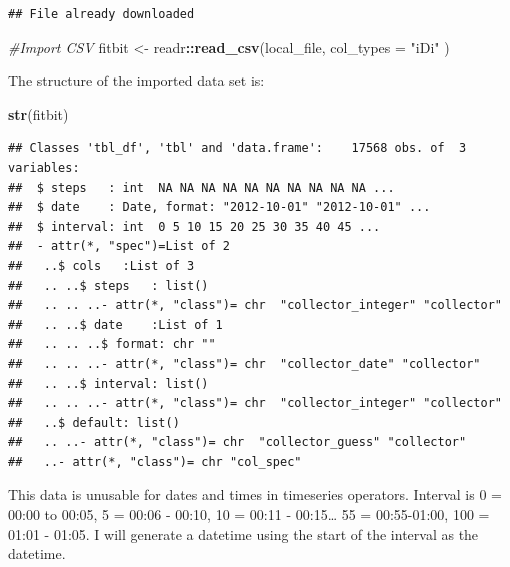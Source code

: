 \documentclass[]{article}
\newenvironment{Shaded}{\begin{snugshade}}{\end{snugshade}}
\newcommand{\KeywordTok}[1]{\textcolor[rgb]{0.13,0.29,0.53}{\textbf{#1}}}
\newcommand{\DataTypeTok}[1]{\textcolor[rgb]{0.13,0.29,0.53}{#1}}
\newcommand{\DecValTok}[1]{\textcolor[rgb]{0.00,0.00,0.81}{#1}}
\newcommand{\StringTok}[1]{\textcolor[rgb]{0.31,0.60,0.02}{#1}}
\newcommand{\CommentTok}[1]{\textcolor[rgb]{0.56,0.35,0.01}{\textit{#1}}}
\newcommand{\OperatorTok}[1]{\textcolor[rgb]{0.81,0.36,0.00}{\textbf{#1}}}
\newcommand{\NormalTok}[1]{#1}
\begin{document}
\begin{verbatim}
## File already downloaded
\end{verbatim}

\begin{Shaded}
\begin{Highlighting}[]
\CommentTok{#Import CSV}
\NormalTok{fitbit <-}\StringTok{ }\NormalTok{readr}\OperatorTok{::}\KeywordTok{read_csv}\NormalTok{(local_file, }\DataTypeTok{col_types =} \StringTok{"iDi"}\NormalTok{ )}
\end{Highlighting}
\end{Shaded}

The structure of the imported data set is:

\begin{Shaded}
\begin{Highlighting}[]
\KeywordTok{str}\NormalTok{(fitbit)}
\end{Highlighting}
\end{Shaded}

\begin{verbatim}
## Classes 'tbl_df', 'tbl' and 'data.frame':    17568 obs. of  3 variables:
##  $ steps   : int  NA NA NA NA NA NA NA NA NA NA ...
##  $ date    : Date, format: "2012-10-01" "2012-10-01" ...
##  $ interval: int  0 5 10 15 20 25 30 35 40 45 ...
##  - attr(*, "spec")=List of 2
##   ..$ cols   :List of 3
##   .. ..$ steps   : list()
##   .. .. ..- attr(*, "class")= chr  "collector_integer" "collector"
##   .. ..$ date    :List of 1
##   .. .. ..$ format: chr ""
##   .. .. ..- attr(*, "class")= chr  "collector_date" "collector"
##   .. ..$ interval: list()
##   .. .. ..- attr(*, "class")= chr  "collector_integer" "collector"
##   ..$ default: list()
##   .. ..- attr(*, "class")= chr  "collector_guess" "collector"
##   ..- attr(*, "class")= chr "col_spec"
\end{verbatim}

This data is unusable for dates and times in timeseries operators.
Interval is 0 = 00:00 to 00:05, 5 = 00:06 - 00:10, 10 = 00:11 -
00:15\ldots{} 55 = 00:55-01:00, 100 = 01:01 - 01:05. I will generate a
datetime using the start of the interval as the datetime.

\begin{Shaded}
\end{Shaded}
\end{document}
